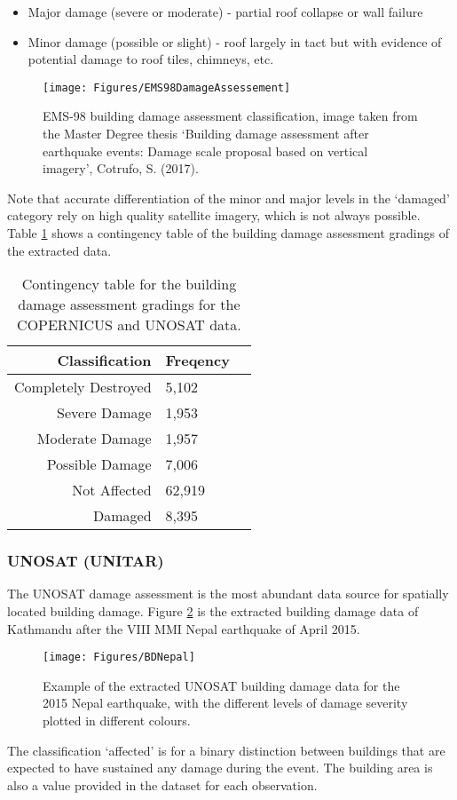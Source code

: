 \documentclass[10pt,a4paper]{article}
\begin{document}
\begin{multicols}{1}
\begin{itemize}
  \item Major damage (severe or moderate) - partial roof collapse or wall failure
  \item Minor damage (possible or slight) - roof largely in tact but with evidence of potential damage to roof tiles, chimneys, etc.
\end{itemize}
\begin{figure}[H]
  \texttt{[image: Figures/EMS98DamageAssessement]}
 	\caption{EMS-98 building damage assessment classification, image taken from the Master Degree thesis `Building damage assessment after earthquake events: Damage scale proposal based on vertical imagery', Cotrufo, S. (2017).}
 	\label{fig:EMS98}
\end{figure}
Note that accurate differentiation of the minor and major levels in the `damaged' category rely on high quality satellite imagery, which is not always possible. Table \ref{tab:BDfreq} shows a contingency table of the building damage assessment gradings of the extracted data.
\begin{table}[ht]
      \caption{Contingency table for the building damage assessment gradings for the COPERNICUS and UNOSAT data.}
  \label{tab:BDfreq}
  \centering
\begin{tabular}{rlr}
  \hline
  Classification & Freqency \\ 
  \hline
  Completely Destroyed & 5,102 \\ 
  Severe Damage & 1,953 \\ 
  Moderate Damage & 1,957 \\ 
  Possible Damage & 7,006 \\
  Not Affected & 62,919 \\   
  Damaged & 8,395 \\ 
   \hline
\end{tabular}
\end{table}
\subsubsection{UNOSAT (UNITAR)}\label{sec:UNOSAT}
The UNOSAT damage assessment is the most abundant data source for spatially located building damage. Figure \ref{fig:UNOSAT} is the extracted building damage data of Kathmandu after the VIII MMI Nepal earthquake of April 2015.
\begin{figure}[H]
   \texttt{[image: Figures/BDNepal]}
 	\caption{Example of the extracted UNOSAT building damage data for the 2015 Nepal earthquake, with the different levels of damage severity plotted in different colours.}
 	\label{fig:UNOSAT}
\end{figure}
The classification `affected' is for a binary distinction between buildings that are expected to have sustained any damage during the event. The building area is also a value provided in the dataset for each observation.

\end{multicols}
\end{document}
